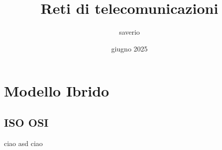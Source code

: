 \documentclass{report}
\title{Reti di telecomunicazioni}
\author{saverio}
\date{giugno 2025}
\begin{document}
\maketitle
\tableofcontents


\chapter{Modello Ibrido}
\section{ISO OSI}
ciao asd ciao
\end{document}
